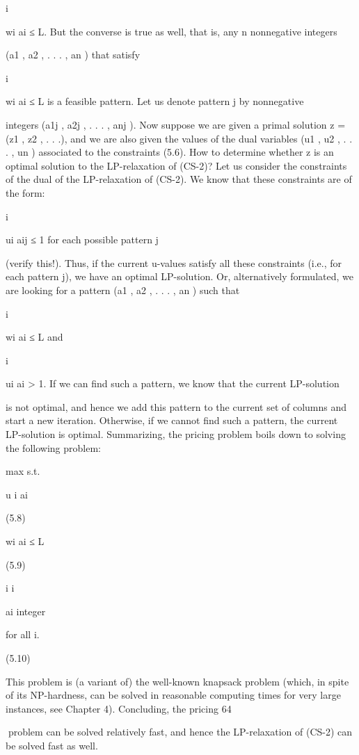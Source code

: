 i

wi ai ≤ L. But the converse is true as well, that is, any n nonnegative integers

(a1 , a2 , . . . , an ) that satisfy

i

wi ai ≤ L is a feasible pattern. Let us denote pattern j by nonnegative

integers (a1j , a2j , . . . , anj ).
Now suppose we are given a primal solution z = (z1 , z2 , . . .), and we are also given the values of the dual
variables (u1 , u2 , . . . , un ) associated to the constraints (5.6). How to determine whether z is an optimal
solution to the LP-relaxation of (CS-2)? Let us consider the constraints of the dual of the LP-relaxation
of (CS-2). We know that these constraints are of the form:

i

ui aij ≤ 1 for each possible pattern j

(verify this!). Thus, if the current u-values satisfy all these constraints (i.e., for each pattern j), we have
an optimal LP-solution. Or, alternatively formulated, we are looking for a pattern (a1 , a2 , . . . , an ) such
that

i

wi ai ≤ L and

i

ui ai > 1. If we can find such a pattern, we know that the current LP-solution

is not optimal, and hence we add this pattern to the current set of columns and start a new iteration.
Otherwise, if we cannot find such a pattern, the current LP-solution is optimal. Summarizing, the pricing
problem boils down to solving the following problem:

max
s.t.

u i ai

(5.8)

wi ai ≤ L

(5.9)

i
i

ai integer

for all i.

(5.10)

This problem is (a variant of) the well-known knapsack problem (which, in spite of its NP-hardness, can
be solved in reasonable computing times for very large instances, see Chapter 4). Concluding, the pricing
64

problem can be solved relatively fast, and hence the LP-relaxation of (CS-2) can be solved fast as well.

